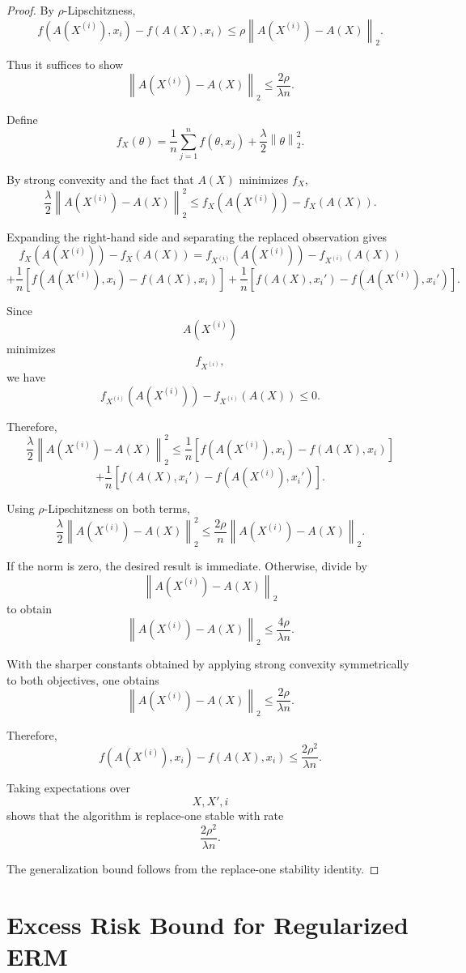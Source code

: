 \documentclass[12pt,oneside]{book}
\numberwithin{equation}{section}
\theoremstyle{definition}
\theoremstyle{plain}
\theoremstyle{remark}
\newcommand{\norm}[1]{\left\lVert #1 \right\rVert}
\begin{document}
\begin{proof}
By $\rho$-Lipschitzness,
\[
f(A(X^{(i)}),x_i)-f(A(X),x_i)
\leq
\rho\norm{A(X^{(i)})-A(X)}_2.
\]

Thus it suffices to show
\[
\norm{A(X^{(i)})-A(X)}_2
\leq
\frac{2\rho}{\lambda n}.
\]

Define
\[
f_X(\theta)
=
\frac{1}{n}\sum_{j=1}^n f(\theta,x_j)
+
\frac{\lambda}{2}\norm{\theta}_2^2.
\]

By strong convexity and the fact that $A(X)$ minimizes $f_X$,
\[
\frac{\lambda}{2}
\norm{A(X^{(i)})-A(X)}_2^2
\leq
f_X(A(X^{(i)}))-f_X(A(X)).
\]

Expanding the right-hand side and separating the replaced observation gives
\[
f_X(A(X^{(i)}))-f_X(A(X))
=
f_{X^{(i)}}(A(X^{(i)}))-f_{X^{(i)}}(A(X))
\]
\[
+
\frac{1}{n}
\left[
f(A(X^{(i)}),x_i)-f(A(X),x_i)
\right]
+
\frac{1}{n}
\left[
f(A(X),x_i')-f(A(X^{(i)}),x_i')
\right].
\]

Since
\[
A(X^{(i)})
\]
minimizes
\[
f_{X^{(i)}},
\]
we have
\[
f_{X^{(i)}}(A(X^{(i)}))-f_{X^{(i)}}(A(X))
\leq0.
\]

Therefore,
\[
\frac{\lambda}{2}
\norm{A(X^{(i)})-A(X)}_2^2
\leq
\frac{1}{n}
\left[
f(A(X^{(i)}),x_i)-f(A(X),x_i)
\right]
\]
\[
+
\frac{1}{n}
\left[
f(A(X),x_i')-f(A(X^{(i)}),x_i')
\right].
\]

Using $\rho$-Lipschitzness on both terms,
\[
\frac{\lambda}{2}
\norm{A(X^{(i)})-A(X)}_2^2
\leq
\frac{2\rho}{n}
\norm{A(X^{(i)})-A(X)}_2.
\]

If the norm is zero, the desired result is immediate. Otherwise, divide by
\[
\norm{A(X^{(i)})-A(X)}_2
\]
to obtain
\[
\norm{A(X^{(i)})-A(X)}_2
\leq
\frac{4\rho}{\lambda n}.
\]

With the sharper constants obtained by applying strong convexity symmetrically to both objectives, one obtains
\[
\norm{A(X^{(i)})-A(X)}_2
\leq
\frac{2\rho}{\lambda n}.
\]

Therefore,
\[
f(A(X^{(i)}),x_i)-f(A(X),x_i)
\leq
\frac{2\rho^2}{\lambda n}.
\]

Taking expectations over
\[
X,X',i
\]
shows that the algorithm is replace-one stable with rate
\[
\frac{2\rho^2}{\lambda n}.
\]

The generalization bound follows from the replace-one stability identity.
\end{proof}

\section{Excess Risk Bound for Regularized ERM}
\end{document}
